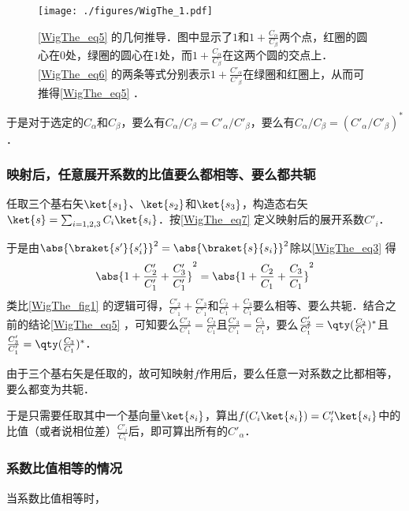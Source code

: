 \begin{figure}[ht]
\centering
\texttt{[image: ./figures/WigThe\_1.pdf]}
\caption{\autoref{WigThe_eq5} 的几何推导．图中显示了$1$和$1+\frac{C_\alpha}{C_\beta}$两个点，红圈的圆心在$0$处，绿圈的圆心在$1$处，而$1+\frac{C_\alpha}{C_\beta}$在这两个圆的交点上．\autoref{WigThe_eq6} 的两条等式分别表示$1+\frac{C'_\alpha}{C'_\beta}$在绿圈和红圈上，从而可推得\autoref{WigThe_eq5} ．} \label{WigThe_fig1}
\end{figure}

于是对于选定的$C_\alpha$和$C_\beta$，要么有$C_\alpha/C_\beta=C'_\alpha/C'_\beta$，要么有$C_\alpha/C_\beta=(C'_\alpha/C'_\beta)^*$．

\subsubsection{映射后，任意展开系数的比值要么都相等、要么都共轭}

任取三个基右矢$\ket{s_1}$、$\ket{s_2}$和$\ket{s_3}$，构造态右矢$\ket{s} = \sum_{i=1, 2, 3}C_i\ket{s_i}$．按\autoref{WigThe_eq7} 定义映射后的展开系数$C'_i$．

于是由$\abs{\braket{s'}{s'_i}}^2=\abs{\braket{s}{s_i}}^2$除以\autoref{WigThe_eq3} 得
\begin{equation}
\abs{1+\frac{C'_2}{C'_1}+\frac{C'_3}{C'_1}}^2 = \abs{1+\frac{C_2}{C_1}+\frac{C_3}{C_1}}^2
\end{equation}
类比\autoref{WigThe_fig1} 的逻辑可得，$\frac{C'_2}{C'_1}+\frac{C'_3}{C'_1}$和$\frac{C_2}{C_1}+\frac{C_3}{C_1}$要么相等、要么共轭．结合之前的结论\autoref{WigThe_eq5} ，可知要么$\frac{C'_2}{C'_1}=\frac{C_2}{C_1}$且$\frac{C'_3}{C'_1}=\frac{C_3}{C_1}$，要么$\frac{C'_2}{C'_1}=\qty(\frac{C_2}{C_1})^*$且$\frac{C'_3}{C'_1}=\qty(\frac{C_3}{C_1})^*$．

由于三个基右矢是任取的，故可知映射$f$作用后，要么任意一对系数之比都相等，要么都变为共轭．

于是只需要任取其中一个基向量$\ket{s_i}$，算出$f(C_i\ket{s_i})=C'_i\ket{s_i}$中的比值（或者说相位差）$\frac{C'_i}{C_i}$后，即可算出所有的$C'_\alpha$．




\subsubsection{系数比值相等的情况}

当系数比值相等时，











